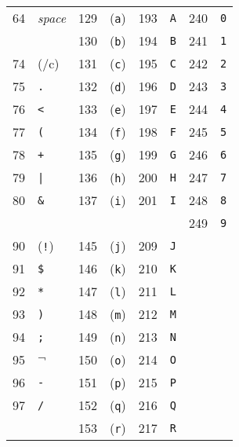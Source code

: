 \documentclass[a4paper]{article}
\begin{document}
\def\cents{\hbox{\rm\rlap/c}} %

\begin{center}
\begin{tabular*}{0.75\textwidth}{@{\extracolsep{\fill}}rlrlrlrl}
 64 & \emph{space} &  129  &  (\verb|a|)  &  193  &  \verb|A|  &  240  &  \verb|0| \\
    &              &  130  &  (\verb|b|)  &  194  &  \verb|B|  &  241  &  \verb|1| \\
 74 &  (\cents)    &  131  &  (\verb|c|)  &  195  &  \verb|C|  &  242  &  \verb|2| \\
 75 &  \verb|.|    &  132  &  (\verb|d|)  &  196  &  \verb|D|  &  243  &  \verb|3| \\
 76 &  \verb|<|    &  133  &  (\verb|e|)  &  197  &  \verb|E|  &  244  &  \verb|4| \\
 77 &  \verb|(|    &  134  &  (\verb|f|)  &  198  &  \verb|F|  &  245  &  \verb|5| \\
 78 &  \verb|+|    &  135  &  (\verb|g|)  &  199  &  \verb|G|  &  246  &  \verb|6| \\
 79 &  \verb+|+    &  136  &  (\verb|h|)  &  200  &  \verb|H|  &  247  &  \verb|7| \\
 80 &  \verb|&|    &  137  &  (\verb|i|)  &  201  &  \verb|I|  &  248  &  \verb|8| \\
    &              &       &              &       &            &  249  &  \verb|9| \\
 90 &  (\verb|!|)  &  145  &  (\verb|j|)  &  209  &  \verb|J|  &       &           \\
 91 &  \verb|$|    &  146  &  (\verb|k|)  &  210  &  \verb|K|  &       &           \\
 92 &  \verb|*|    &  147  &  (\verb|l|)  &  211  &  \verb|L|  &       &           \\
 93 &  \verb|)|    &  148  &  (\verb|m|)  &  212  &  \verb|M|  &       &           \\
 94 &  \verb|;|    &  149  &  (\verb|n|)  &  213  &  \verb|N|  &       &           \\
 95 &  $\lnot$     &  150  &  (\verb|o|)  &  214  &  \verb|O|  &       &           \\
 96 &  \verb|-|    &  151  &  (\verb|p|)  &  215  &  \verb|P|  &       &           \\
 97 &  \verb|/|    &  152  &  (\verb|q|)  &  216  &  \verb|Q|  &       &           \\
    &              &  153  &  (\verb|r|)  &  217  &  \verb|R|  &       &           \\

\end{tabular*}
\end{center}
\end{document}
